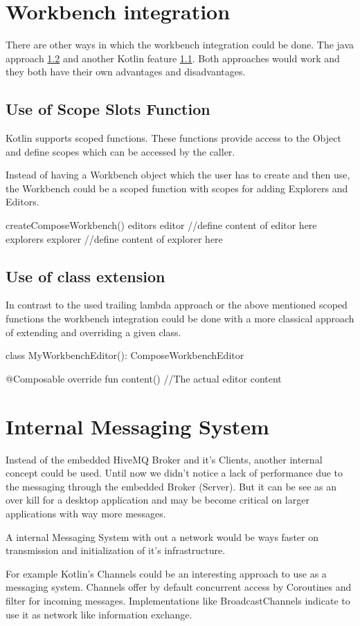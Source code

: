 \section{Workbench integration}
There are other ways in which the workbench integration could be done. The java approach \ref{Use_Of_class_extention} and another Kotlin feature \ref{Use_of_scope_slots}. Both approaches would work and they both have their own advantages and disadvantages.

\subsection{Use of Scope Slots Function} \label{Use_of_scope_slots}
Kotlin supports scoped functions. These functions provide access to the Object and define scopes which can be accessed by the caller.

Instead of having a Workbench object which the user has to create and then use, the Workbench could be a scoped function with scopes for adding Explorers and Editors.

\begin{kotlincode}
createComposeWorkbench() {
    editors{
        editor{
            //define content of editor here
        }
    }
    explorers{
        explorer{
            //define content of explorer here
        }
    }
}
\end{kotlincode}

\subsection{Use of class extension} \label{Use_Of_class_extention}
In contrast to the used trailing lambda approach or the above mentioned scoped functions the workbench integration could be done with a more classical approach of extending and overriding a given class. 

\begin{kotlincode}
class MyWorkbenchEditor(): ComposeWorkbenchEditor {
    
    @Composable
    override fun content(){
        //The actual editor content
    }
}
\end{kotlincode}


\section{Internal Messaging System}
Instead of the embedded HiveMQ Broker and it's Clients, another internal concept could be used. Until now we didn't notice a lack of performance due to the messaging through the embedded Broker (Server). But it can be see as an over kill for a desktop application and may be become critical on larger applications with way more messages.

A internal Messaging System with out a network would be ways faster on transmission and initialization of it's infrastructure.

For example Kotlin's Channels could be an interesting approach to use as a messaging system. Channels offer by default concurrent access by Coroutines and filter for incoming messages. Implementations like BroadcastChannels indicate to use it as network like information exchange.